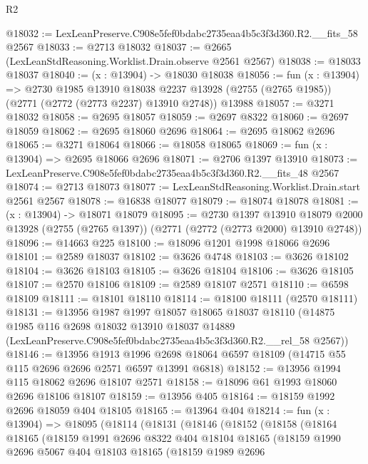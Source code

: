 \begin{lexlean}{R2}
\begin{coremodule}
@18032 := LexLeanPreserve.C908e5fef0bdabc2735eaa4b5c3f3d360.R2.__fits_58 @2567
@18033 := @2713 @18032
@18037 := @2665 (LexLeanStdReasoning.Worklist.Drain.observe @2561 @2567)
@18038 := @18033 @18037
@18040 := (x : @13904) -> @18030 @18038
@18056 := fun (x : @13904) =>
  @2730
    @1985
    @13910
    @18038
    @2237
    @13928
    (@2755 (@2765 @1985))
    (@2771 (@2772 (@2773 @2237) @13910 @2748))
    @13988
@18057 := @3271 @18032
@18058 := @2695 @18057
@18059 := @2697 @8322
@18060 := @2697 @18059
@18062 := @2695 @18060 @2696
@18064 := @2695 @18062 @2696
@18065 := @3271 @18064
@18066 := @18058 @18065
@18069 := fun (x : @13904) => @2695 @18066 @2696
@18071 := @2706 @1397 @13910
@18073 := LexLeanPreserve.C908e5fef0bdabc2735eaa4b5c3f3d360.R2.__fits_48 @2567
@18074 := @2713 @18073
@18077 := LexLeanStdReasoning.Worklist.Drain.start @2561 @2567
@18078 := @16838 @18077
@18079 := @18074 @18078
@18081 := (x : @13904) -> @18071 @18079
@18095 := @2730
    @1397
    @13910
    @18079
    @2000
    @13928
    (@2755 (@2765 @1397))
    (@2771 (@2772 (@2773 @2000) @13910 @2748))
@18096 := @14663 @225
@18100 := @18096 @1201 @1998 @18066 @2696
@18101 := @2589 @18037
@18102 := @3626 @4748
@18103 := @3626 @18102
@18104 := @3626 @18103
@18105 := @3626 @18104
@18106 := @3626 @18105
@18107 := @2570 @18106
@18109 := @2589 @18107 @2571
@18110 := @6598 @18109
@18111 := @18101 @18110
@18114 := @18100 @18111 (@2570 @18111)
@18131 := @13956
    @1987
    @1997
    @18057
    @18065
    @18037
    @18110
    (@14875
      @1985
      @116
      @2698
      @18032
      @13910
      @18037
      @14889
      (LexLeanPreserve.C908e5fef0bdabc2735eaa4b5c3f3d360.R2.__rel_58 @2567))
@18146 := @13956
    @1913
    @1996
    @2698
    @18064
    @6597
    @18109
    (@14715 @55 @115 @2696 @2696 @2571 @6597 @13991 @6818)
@18152 := @13956 @1994 @115 @18062 @2696 @18107 @2571
@18158 := @18096 @61 @1993 @18060 @2696 @18106 @18107
@18159 := @13956 @405
@18164 := @18159 @1992 @2696 @18059 @404 @18105
@18165 := @13964 @404
@18214 := fun (x : @13904) =>
  @18095
    (@18114
      (@18131
        (@18146
          (@18152
            (@18158
              (@18164
                @18165
                (@18159
                  @1991
                  @2696
                  @8322
                  @404
                  @18104
                  @18165
                  (@18159
                    @1990
                    @2696
                    @5067
                    @404
                    @18103
                    @18165
                    (@18159
                      @1989
                      @2696

\end{coremodule}
\end{lexlean}

